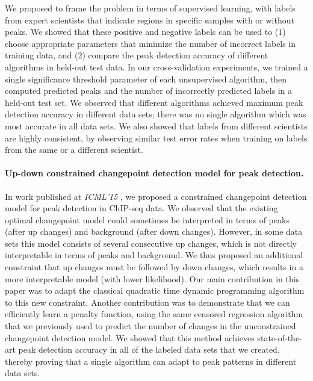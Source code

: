 \documentclass{article}
\begin{document}
We proposed to frame the problem in terms of supervised learning, with
labels from expert scientists that indicate regions in specific
samples with or without peaks. We showed that these positive and
negative labels can be used to (1) choose appropriate parameters that
minimize the number of incorrect labels in training data, and (2)
compare the peak detection accuracy of different algorithms in
held-out test data. In our cross-validation experiments, we trained a
single significance threshold parameter of each unsupervised
algorithm, then computed predicted peaks and the number of incorrectly
predicted labels in a held-out test set. We observed that different
algorithms achieved maximum peak detection accuracy in different data
sets; there was no single algorithm which was most accurate in all
data sets. We also showed that labels from different scientists are
highly consistent, by observing similar test error rates when training
on labels from the same or a different scientist.

\paragraph{Up-down constrained changepoint detection model for peak
  detection.} In work published at \emph{ICML'15}
\citep{HOCKING-PeakSeg}, we proposed a constrained changepoint
detection model for peak detection in ChIP-seq data. We observed that
the existing optimal changepoint model could sometimes be interpreted
in terms of peaks (after up changes) and background (after down
changes). However, in some data sets this model
consists of several consecutive up changes, which is not directly
interpretable in terms of peaks and background. We thus proposed an
additional constraint that up changes must be followed by down
changes, which results in a more interpretable model (with lower
likelihood). Our main contribution in this paper was to adapt the
classical quadratic time dynamic programming algorithm to this new
constraint. Another contribution was to demonstrate that we can
efficiently learn a penalty function, using the same censored
regression algorithm that we previously used to predict the number of
changes in the unconstrained changepoint detection model. We showed
that this method achieves state-of-the-art peak detection accuracy in
all of the labeled data sets that we created, thereby proving that a
single algorithm can adapt to peak patterns in different data sets.
\end{document}
